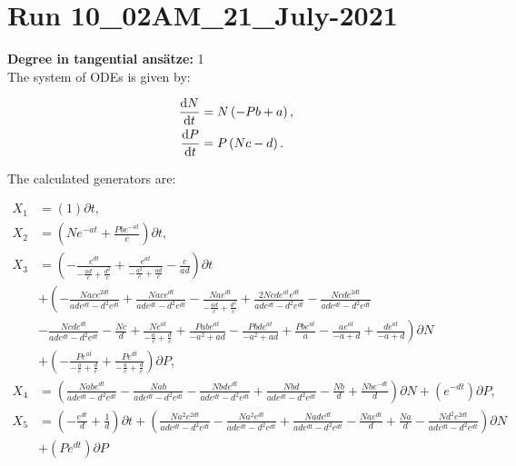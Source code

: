 \section*{Run 10\_02AM\_21\_July-2021}
\textbf{Degree in tangential ansätze:}	1\\
The system of ODEs is given by:

\begin{align*}
\dv{N}{t}&=N \left(- P b + a\right),\\
\dv{P}{t}&=P \left(N c - d\right).\\
\end{align*}

\noindent The calculated generators are:

\begin{align*}
X_{1}&=\left( 1 \right)\partial t,\\
  X_{2}&=\left( N e^{- a t} + \frac{P b e^{- a t}}{c} \right)\partial t,\\
  X_{3}&=\left( - \frac{e^{d t}}{- \frac{a d}{c} + \frac{d^{2}}{c}} + \frac{e^{a t}}{- \frac{a^{2}}{c} + \frac{a d}{c}} - \frac{c}{a d} \right)\partial t\\
     &+\left( - \frac{N a c e^{2 d t}}{a d e^{d t} - d^{2} e^{d t}} + \frac{N a c e^{d t}}{a d e^{d t} - d^{2} e^{d t}} - \frac{N a e^{d t}}{- \frac{a d}{c} + \frac{d^{2}}{c}} + \frac{2 N c d e^{a t} e^{d t}}{a d e^{d t} - d^{2} e^{d t}} - \frac{N c d e^{2 d t}}{a d e^{d t} - d^{2} e^{d t}}\right.\\
     &\left.- \frac{N c d e^{d t}}{a d e^{d t} - d^{2} e^{d t}} - \frac{N c}{d} + \frac{N e^{a t}}{- \frac{a}{c} + \frac{d}{c}} + \frac{P a b e^{a t}}{- a^{2} + a d} - \frac{P b d e^{a t}}{- a^{2} + a d} + \frac{P b e^{a t}}{a} - \frac{a e^{a t}}{- a + d} + \frac{d e^{a t}}{- a + d} \right)\partial N\\
  &+\left( - \frac{P e^{a t}}{- \frac{a}{c} + \frac{d}{c}} + \frac{P e^{d t}}{- \frac{a}{c} + \frac{d}{c}} \right)\partial P,\\
X_{4}&=\left( \frac{N a b e^{d t}}{a d e^{d t} - d^{2} e^{d t}} - \frac{N a b}{a d e^{d t} - d^{2} e^{d t}} - \frac{N b d e^{d t}}{a d e^{d t} - d^{2} e^{d t}} + \frac{N b d}{a d e^{d t} - d^{2} e^{d t}} - \frac{N b}{d} + \frac{N b e^{- d t}}{d} \right)\partial N+\left( e^{- d t} \right)\partial P,\\
  X_{5}&=\left( - \frac{e^{d t}}{d} + \frac{1}{d} \right)\partial t+\left( \frac{N a^{2} e^{2 d t}}{a d e^{d t} - d^{2} e^{d t}} - \frac{N a^{2}e^{dt}}{a d e^{d t} - d^{2} e^{d t}} + \frac{N a d e^{d t}}{a d e^{d t} - d^{2} e^{d t}} - \frac{N a e^{d t}}{d} + \frac{N a}{d} - \frac{N d^{2} e^{2 dt}}{a d e^{d t} - d^{2} e^{d t}} \right)\partial N\\
  &+\left( P e^{dt}\right)\partial P
\end{align*}
